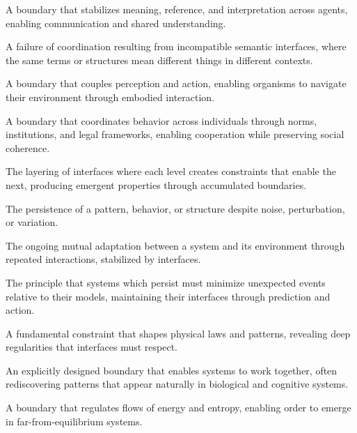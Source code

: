 \documentclass[
  openright]{book}
\renewenvironment{description}
  {\list{}{\labelwidth 0pt \itemindent-\leftmargin \leftmargin 2.5em
          \itemsep 0.4\baselineskip
          \parsep 0pt
          \let\makelabel\descriptionlabel}}
  {\endlist}
\newcommand*\descriptionlabel[1]{\hspace\labelsep\normalfont\bfseries #1}
\begin{document}
\begin{description}
\item[Semantic Interface] A boundary that stabilizes meaning, reference, and interpretation across agents, enabling communication and shared understanding.

\item[Semantic Mismatch] A failure of coordination resulting from incompatible semantic interfaces, where the same terms or structures mean different things in different contexts.

\item[Sensorimotor Interface] A boundary that couples perception and action, enabling organisms to navigate their environment through embodied interaction.

\item[Social Interface] A boundary that coordinates behavior across individuals through norms, institutions, and legal frameworks, enabling cooperation while preserving social coherence.

\item[Stacking] The layering of interfaces where each level creates constraints that enable the next, producing emergent properties through accumulated boundaries.

\item[Stability] The persistence of a pattern, behavior, or structure despite noise, perturbation, or variation.

\item[Structural Coupling] The ongoing mutual adaptation between a system and its environment through repeated interactions, stabilized by interfaces.

\item[Surprise Minimization] The principle that systems which persist must minimize unexpected events relative to their models, maintaining their interfaces through prediction and action.

\item[Symmetry] A fundamental constraint that shapes physical laws and patterns, revealing deep regularities that interfaces must respect.

\item[Technological Interface] An explicitly designed boundary that enables systems to work together, often rediscovering patterns that appear naturally in biological and cognitive systems.

\item[Thermodynamic Interface] A boundary that regulates flows of energy and entropy, enabling order to emerge in far-from-equilibrium systems.


\end{description}
\end{document}
